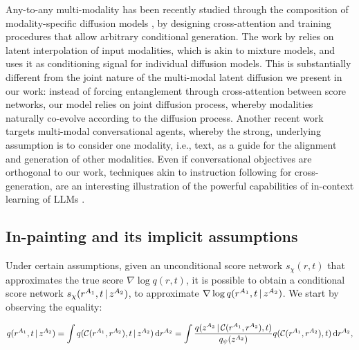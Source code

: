 


 Any-to-any multi-modality has been recently studied through the composition of modality-specific diffusion models \citep{tang2023anytoany}, by designing cross-attention and training procedures that allow arbitrary conditional generation. The work by \citet{tang2023anytoany} relies on latent interpolation of input modalities, which is akin to mixture models, and uses it as conditioning signal for individual diffusion models. This is substantially different from the joint nature of the multi-modal latent diffusion we present in our work: instead of forcing entanglement through cross-attention between score networks, our model relies on joint diffusion process, whereby modalities naturally co-evolve according to the diffusion process. Another recent work \citep{wu2023nextgpt} targets multi-modal conversational agents, whereby the strong, underlying assumption is to consider one modality, i.e., text, as a guide for the alignment and generation of other modalities. Even if conversational objectives are orthogonal to our work, techniques akin to instruction following for cross-generation, are an interesting illustration of the powerful capabilities of in-context learning of LLMs \citep{xie2022an, min2022rethinking}.


\subsection{In-painting and its implicit assumptions}\label{sec:inpainting}
Under certain assumptions, given an unconditional score network $s_\chi(r,t)$ that approximates the true score $\nabla\log q(r,t)$, it is possible to obtain a conditional score network $s_\chi(r^{A_1},t\,|\, z^{A_2})$, to approximate $\nabla\log q(r^{A_1},t\,|\, z^{A_2})$. We start by observing the equality:

\begin{footnotesize}
\begin{equation}\label{eq:inp}
    q(r^{A_1},t\,|\, z^{A_2})=\int q(\mathcal{C}(r^{A_1},r^{A_2}),t\,|\, z^{A_2}) \operatorname{d}\!{r}^{A_2}=\int \frac{q(z^{A_2}\,|\, \mathcal{C}(r^{A_1},r^{A_2}),t)}{q_\psi(z^{A_2})}q(\mathcal{C}(r^{A_1},r^{A_2}),t)\operatorname{d}\!{r}^{A_2},
\end{equation}
\end{footnotesize}


